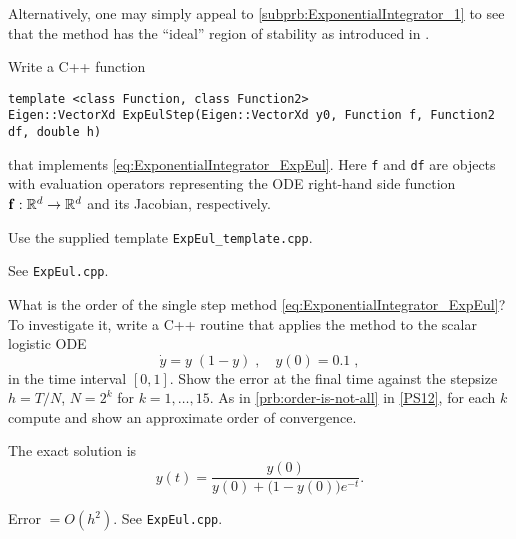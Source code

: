 \begin{problem}
\begin{subproblem}[2]
\begin{solution}
Alternatively, one may simply appeal to \ref{subprb:ExponentialIntegrator_1}
to see that the method has the ``ideal'' region of stability as introduced in 
.  
\end{solution}
\end{subproblem}


\begin{subproblem}[2] \label{subprb:ExponentialIntegrator_2}
Write a C++ function
\begin{lstlisting}
template <class Function, class Function2>
Eigen::VectorXd ExpEulStep(Eigen::VectorXd y0, Function f, Function2 df, double h)
\end{lstlisting}
that implements \eqref{eq:ExponentialIntegrator_ExpEul}.
Here \texttt{f} and \texttt{df} are objects with evaluation operators representing the ODE right-hand side function ${\mathbf{f}}:\mathbb{R}^d\rightarrow\mathbb{R}^d$ and its Jacobian, respectively.

\begin{hint}
Use the supplied template \texttt{ExpEul\_template.cpp}.
\end{hint}

\begin{solution}
See \texttt{ExpEul.cpp}.
\end{solution}
\end{subproblem}



\begin{subproblem}[3] \label{subprb:ExponentialIntegrator_3}
What is the order of the single step method \eqref{eq:ExponentialIntegrator_ExpEul}?
To investigate it, write a C++ routine
that applies the method to the scalar logistic ODE
$$  \dot y  = y\;(1-y)\;,\quad y(0) = 0.1\;, $$
in the time interval $[0,1]$.  Show the error at the final time against the stepsize $h=T/N$, $N=2^k$ for $k=1,\dots,15$. As in \ref{prb:order-is-not-all} in \ref{PS12}, for each $k$ compute and show an approximate order of convergence.


\begin{hint}
The exact solution is
$$ y(t) = \frac{y(0)}{y(0)+\big(1-y(0)\big)e^{-t}}.$$
\end{hint}

\begin{solution}
Error $= O(h^2)$. See \texttt{ExpEul.cpp}.
\end{solution}
\end{subproblem}

\end{problem}
